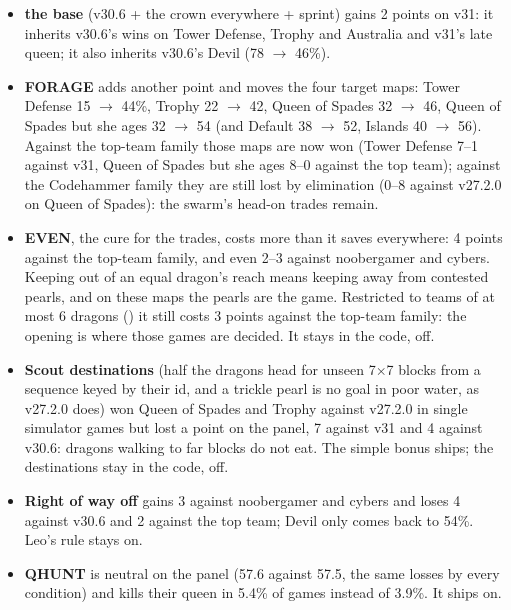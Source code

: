 \documentclass[11pt,a4paper]{article}
\newcommand{\code}[1]{\texttt{\detokenize{#1}}}
\begin{document}
\begin{itemize}
  \item \textbf{the base} (v30.6 + the crown everywhere + sprint) gains 2 points on v31: it inherits v30.6's wins on
        Tower Defense, Trophy and Australia and v31's late queen; it also inherits v30.6's Devil (78 $\rightarrow$ 46\%).
  \item \textbf{FORAGE} adds another point and moves the four target maps: Tower Defense 15 $\rightarrow$ 44\%, Trophy 22
        $\rightarrow$ 42, Queen of Spades 32 $\rightarrow$ 46, Queen of Spades but she ages 32 $\rightarrow$ 54 (and Default
        38 $\rightarrow$ 52, Islands 40 $\rightarrow$ 56). Against the top-team family those maps are now won (Tower Defense
        7--1 against v31, Queen of Spades but she ages 8--0 against the top team); against the Codehammer family they are
        still lost by elimination (0--8 against v27.2.0 on Queen of Spades): the swarm's head-on trades remain.
  \item \textbf{EVEN}, the cure for the trades, costs more than it saves everywhere: 4 points against the top-team family,
        and even 2--3 against noobergamer and cybers. Keeping out of an equal dragon's reach means keeping away from
        contested pearls, and on these maps the pearls are the game. Restricted to teams of at most 6 dragons
        (\code{EVEN_UNITS}) it still costs 3 points against the top-team family: the opening is where those games are
        decided. It stays in the code, off.
  \item \textbf{Scout destinations} (half the dragons head for unseen 7$\times$7 blocks from a sequence keyed by their id,
        and a trickle pearl is no goal in poor water, as v27.2.0 does) won Queen of Spades and Trophy against v27.2.0 in
        single simulator games but lost a point on the panel, 7 against v31 and 4 against v30.6: dragons walking to far
        blocks do not eat. The simple bonus ships; the destinations stay in the code, off.
  \item \textbf{Right of way off} gains 3 against noobergamer and cybers and loses 4 against v30.6 and 2 against the
        top team; Devil only comes back to 54\%. Leo's rule stays on.
  \item \textbf{QHUNT} is neutral on the panel (57.6 against 57.5, the same losses by every condition) and kills their
        queen in 5.4\% of games instead of 3.9\%. It ships on.
\end{itemize}
\end{document}
